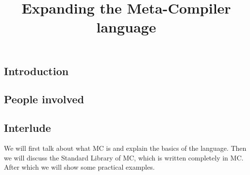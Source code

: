 


\begin{multicols}{3}
\title{Expanding the Meta-Compiler language}
\author{\writer}






\part{Introduction}

\chapter{People involved}

\chapter{Interlude}

We will first talk about what MC is and explain the basics of the language.
Then we will discuss the Standard Library of MC, which is written completely in MC.
After which we will show some practical examples.


\end{multicols}
